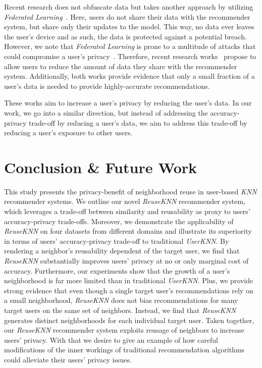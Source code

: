 \documentclass[manuscript,review,anonymous]{acmart}
\begin{document}
Recent research does not obfuscate data but takes another approach by utilizing \emph{Federated Learning}~\cite{ammad2019federated,chen2018federated}.
Here, users do not share their data with the recommender system, but share only their updates to the model.
This way, no data ever leaves the user's device and as such, the data is protected against a potential breach.
However, we note that \emph{Federated Learning} is prone to a multitude of attacks that could compromise a user's privacy~\cite{nasr2019comprehensive}.
Therefore, recent research works~\cite{anelli2021put,robustnessofmetamf} propose to allow users to reduce the amount of data they share with the recommender system.
Additionally, both works provide evidence that only a small fraction of a user's data is needed to provide highly-accurate recommendations.

These works aim to increase a user's privacy by reducing the user's data.
In our work, we go into a similar direction, but instead of addressing the accuracy-privacy trade-off by reducing a user's data, we aim to address this trade-off by reducing a user's exposure to other users.



\section{Conclusion \& Future Work}
This study presents the privacy-benefit of neighborhood reuse in user-based \emph{KNN} recommender systems.
We outline our novel \emph{ReuseKNN} recommender system, which leverages a trade-off between similarity and reusability as proxy to users' accuracy-privacy trade-offs.
Moreover, we demonstrate the applicability of \emph{ReuseKNN} on four datasets from different domains and illustrate its superiority in terms of users' accuracy-privacy trade-off to traditional \emph{UserKNN}.
By rendering a neighbor's reusability dependent of the target user, we find that \emph{ReuseKNN} substantially improves users' privacy at no or only marginal cost of accuracy.
Furthermore, our experiments show that the growth of a user's neighborhood is far more limited than in traditional \emph{UserKNN}.
Plus, we provide strong evidence that even though a single target user's recommendations rely on a small neighborhood, \emph{ReuseKNN} does not bias recommendations for many target users on the same set of neighbors.
Instead, we find that \emph{ReuseKNN} generates distinct neighborhoods for each individual target user.
Taken together, our \emph{ReuseKNN} recommender system exploits reusage of neighbors to increase users' privacy.
With that we desire to give an example of how careful modifications of the inner workings of traditional recommendation algorithms could alleviate their users' privacy issues.
\end{document}
